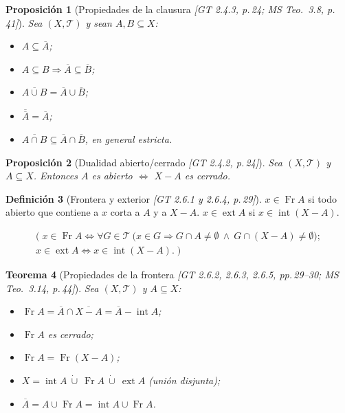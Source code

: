 \documentclass[11pt,a4paper]{article}
\newenvironment{lista}{\leavevmode\begin{itemize}[leftmargin=1.5em,itemsep=1pt,topsep=2pt,parsep=0pt]}{\end{itemize}}
\newcommand{\lgc}[1]{\par\vspace{-3pt}\begin{gather*}\big(\;#1\;\big)\end{gather*}\vspace{-6pt}}
\theoremstyle{definition}
\newtheorem{definicion}{Definición}[section]
\theoremstyle{plain}
\newtheorem{teorema}[definicion]{Teorema}
\newtheorem{proposicion}[definicion]{Proposición}
\newcommand{\fnt}[1]{{\normalfont\small\itshape\color{gray!150!black}[#1]}}
\newcommand{\cl}[1]{\overline{#1}}
\newcommand{\intr}{\operatorname{int}}
\newcommand{\fr}{\operatorname{Fr}}
\newcommand{\ext}{\operatorname{ext}}
\newcommand{\tp}{\mathcal{T}}
\begin{document}
\begin{proposicion}[Propiedades de la clausura \fnt{GT 2.4.3, p.\,24; MS Teo.\ 3.8, p.\,41}]
Sea $(X,\tp)$ y sean $A,B\subseteq X$:
\begin{lista}
\item $A\subseteq\cl A$;
\item $A\subseteq B\Rightarrow\cl A\subseteq\cl B$;
\item $\cl{A\cup B}=\cl A\cup\cl B$;
\item $\cl{\cl A}=\cl A$;
\item $\cl{A\cap B}\subseteq\cl A\cap\cl B$, en general estricta.
\end{lista}
\end{proposicion}

\begin{proposicion}[Dualidad abierto/cerrado \fnt{GT 2.4.2, p.\,24}]
Sea $(X,\tp)$ y $A\subseteq X$. Entonces $A$ es abierto $\iff$ $X-A$ es cerrado.
\end{proposicion}

\begin{definicion}[Frontera y exterior \fnt{GT 2.6.1 y 2.6.4, p.\,29}]
$x\in\fr A$ si todo abierto que contiene a $x$ corta a $A$ y a $X-A$. $x\in\ext A$ si $x\in\intr(X-A)$.
\lgc{x\in\fr A\iff \forall G\in\tp\ \big(x\in G\Rightarrow G\cap A\ne\emptyset\ \wedge\ G\cap(X-A)\ne\emptyset\big);\\
x\in\ext A\iff x\in\intr(X-A).}
\end{definicion}

\begin{teorema}[Propiedades de la frontera \fnt{GT 2.6.2, 2.6.3, 2.6.5, pp.\,29--30; MS Teo.\ 3.14, p.\,44}]
Sea $(X,\tp)$ y $A\subseteq X$:
\begin{lista}
\item $\fr A=\cl A\cap\cl{X-A}=\cl A-\intr A$;
\item $\fr A$ es cerrado;
\item $\fr A=\fr(X-A)$;
\item $X=\intr A\ \dot\cup\ \fr A\ \dot\cup\ \ext A$ (unión disjunta);
\item $\cl A=A\cup\fr A=\intr A\cup\fr A$.
\end{lista}
\end{teorema}
\end{document}
